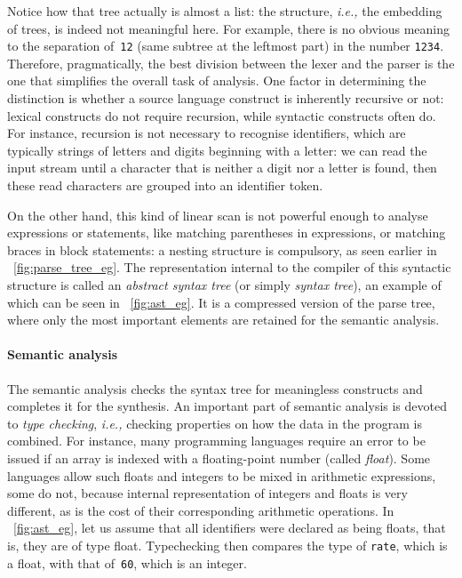 Notice how that tree actually is almost a list: the structure,
\emph{i.e.,} the embedding of trees, is indeed not meaningful
here. For example, there is no obvious meaning to the separation
of~\texttt{12} (same subtree at the leftmost part) in the number
\texttt{1234}. Therefore, pragmatically, the best division between the
lexer and the parser is the one that simplifies the overall task of
analysis. One factor in determining the distinction is whether a
source language construct is inherently recursive or not: lexical
constructs do not require recursion, while syntactic constructs often
do. For instance, recursion is not necessary to recognise identifiers,
which are typically strings of letters and digits beginning with a
letter: we can read the input stream until a character that is neither
a digit nor a letter is found, then these read characters are grouped
into an identifier token.

On the other hand, this kind of linear scan is not powerful enough to
analyse expressions or statements, like matching parentheses in
expressions, or matching braces in block statements: a nesting
structure is compulsory, as seen earlier
in \fig~\vref{fig:parse_tree_eg}. The
representation internal to the compiler of this syntactic structure is 
called an \emph{abstract syntax tree} (or simply
\emph{syntax tree}), an example of which can be seen in
\fig~\vref{fig:ast_eg}. It is a compressed version of the parse tree, where
only the most important elements are retained for the semantic
analysis.

\paragraph{Semantic analysis}

The semantic analysis checks the syntax tree for meaningless
constructs and completes it for the synthesis. An important part of
semantic analysis is devoted to \emph{type checking}, \emph{i.e.,}
checking properties on how the data in the program is combined. For
instance, many programming languages require an error to be issued if
an array is indexed with a floating-point number (called
\emph{float}). Some languages allow such floats and integers to be
mixed in arithmetic expressions, some do not, because internal
representation of integers and floats is very different, as is the
cost of their corresponding arithmetic operations. In
\fig~\vref{fig:ast_eg}, let us assume that all identifiers were declared as
being floats, that is, they are of type float. Typechecking then
compares the type of \texttt{rate}, which is a float, with that
of~\texttt{60}, which is an integer.

